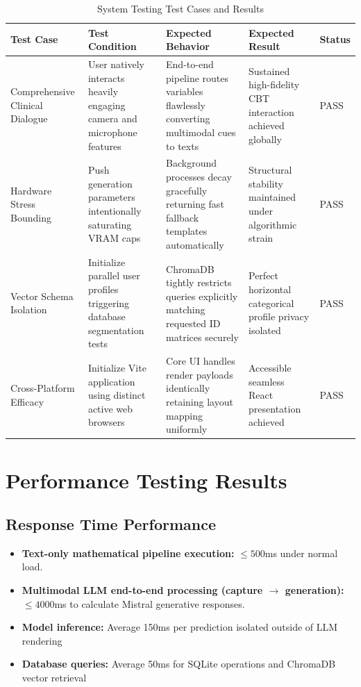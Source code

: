\documentclass[11pt]{report}
\begin{document}
\begin{table}[H]
    \centering
    \caption{System Testing Test Cases and Results}
    \label{tab:system_testing}
    \begin{tabular}{|p{3cm}|p{3.5cm}|p{3.5cm}|p{3cm}|p{1.3cm}|}
        \hline
        Test Case & Test Condition & Expected Behavior & Expected Result & Status \\ \hline
        Comprehensive Clinical Dialogue & User natively interacts heavily engaging camera and microphone features & End-to-end pipeline routes variables flawlessly converting multimodal cues to texts & Sustained high-fidelity CBT interaction achieved globally & PASS \\ \hline
        Hardware Stress Bounding & Push generation parameters intentionally saturating VRAM caps & Background processes decay gracefully returning fast fallback templates automatically & Structural stability maintained under algorithmic strain & PASS \\ \hline
        Vector Schema Isolation & Initialize parallel user profiles triggering database segmentation tests & ChromaDB tightly restricts queries explicitly matching requested ID matrices securely & Perfect horizontal categorical profile privacy isolated & PASS \\ \hline
        Cross-Platform Efficacy & Initialize Vite application using distinct active web browsers & Core UI handles render payloads identically retaining layout mapping uniformly & Accessible seamless React presentation achieved & PASS \\ \hline
    \end{tabular}
\end{table}

\section{Performance Testing Results}

\subsection{Response Time Performance}
\begin{itemize}
    \item \textbf{Text-only mathematical pipeline execution:} $\leq 500$ms under normal load.
    \item \textbf{Multimodal LLM end-to-end processing (capture $\to$ generation):} $\leq 4000$ms to calculate Mistral generative responses.
    \item \textbf{Model inference:} Average 150ms per prediction isolated outside of LLM rendering
    \item \textbf{Database queries:} Average 50ms for SQLite operations and ChromaDB vector retrieval
\end{itemize}
\end{document}
